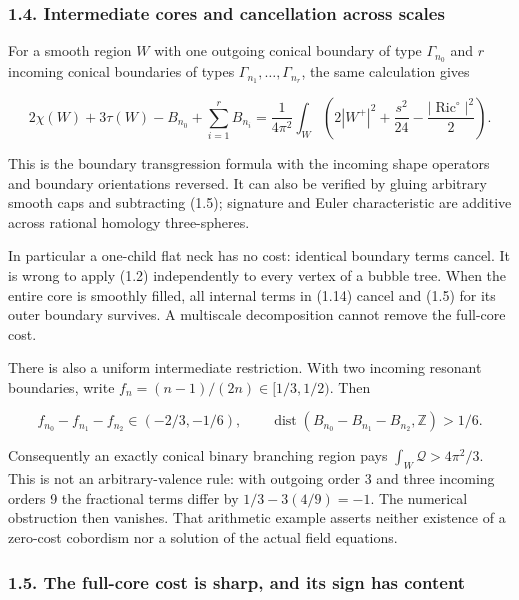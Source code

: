 \documentclass[
  10pt,
]{article}
\begin{document}
\hypertarget{intermediate-cores-and-cancellation-across-scales}{%
\subsubsection{1.4. Intermediate cores and cancellation across
scales}\label{intermediate-cores-and-cancellation-across-scales}}

For a smooth region \(W\) with one outgoing conical boundary of type
\(\Gamma_{n_0}\) and \(r\) incoming conical boundaries of types
\(\Gamma_{n_1},\ldots,\Gamma_{n_r}\), the same calculation gives

\[
 2\chi(W)+3\tau(W)-B_{n_0}+\sum_{i=1}^r B_{n_i}
   =\frac1{4\pi^2}\int_W
     \left(2|W^+|^2+\frac{s^2}{24}
                         -\frac{|\operatorname{Ric}^{\circ}|^2}{2}\right).
                                                        \tag{1.14}
\]

This is the boundary transgression formula with the incoming shape
operators and boundary orientations reversed. It can also be verified by
gluing arbitrary smooth caps and subtracting (1.5); signature and Euler
characteristic are additive across rational homology three-spheres.

In particular a one-child flat neck has no cost: identical boundary
terms cancel. It is wrong to apply (1.2) independently to every vertex
of a bubble tree. When the entire core is smoothly filled, all internal
terms in (1.14) cancel and (1.5) for its outer boundary survives. A
multiscale decomposition cannot remove the full-core cost.

There is also a uniform intermediate restriction. With two incoming
resonant boundaries, write \(f_n=(n-1)/(2n)\in[1/3,1/2)\). Then

\[
 f_{n_0}-f_{n_1}-f_{n_2}\in(-2/3,-1/6),\qquad
 \operatorname{dist}(B_{n_0}-B_{n_1}-B_{n_2},\mathbb Z)>1/6.
\]

Consequently an exactly conical binary branching region pays
\(\int_W\mathscr Q>4\pi^2/3\). This is not an arbitrary-valence rule:
with outgoing order 3 and three incoming orders 9 the fractional terms
differ by \(1/3-3(4/9)=-1\). The numerical obstruction then vanishes.
That arithmetic example asserts neither existence of a zero-cost
cobordism nor a solution of the actual field equations.

\hypertarget{the-full-core-cost-is-sharp-and-its-sign-has-content}{%
\subsubsection{1.5. The full-core cost is sharp, and its sign has
content}\label{the-full-core-cost-is-sharp-and-its-sign-has-content}}
\end{document}
